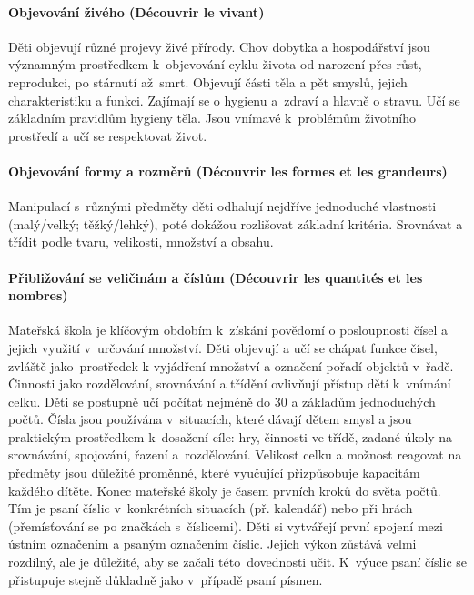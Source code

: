 			\paragraph{Objevování živého (Découvrir le vivant)} 
				Děti objevují různé projevy živé přírody. Chov dobytka a hospodářství jsou významným prostředkem k objevování cyklu života od narození přes růst, reprodukci, po stárnutí až smrt.
				Objevují části těla a pět smyslů, jejich charakteristiku a funkci. Zajímají se o hygienu a zdraví a hlavně o stravu. Učí se základním pravidlům hygieny těla. 
				Jsou vnímavé k problémům životního prostředí a učí se respektovat život. 
			\paragraph{Objevování formy a rozměrů (Découvrir les formes et les grandeurs)}
				Manipulací s různými předměty děti odhalují nejdříve jednoduché vlastnosti (malý/velký; těžký/lehký), poté dokážou rozlišovat základní kritéria. Srovnávat a třídit podle tvaru, velikosti, množství a obsahu.
			\paragraph{Přibližování se veličinám a číslům (Découvrir les quantités et les nombres)}
				Mateřská škola je klíčovým obdobím k získání povědomí o posloupnosti čísel a jejich využití v určování množství. Děti objevují a učí se chápat funkce čísel, zvláště jako prostředek k vyjádření množství a označení pořadí objektů v řadě.
				Činnosti jako rozdělování, srovnávání a třídění ovlivňují přístup dětí k vnímání celku. Děti se postupně učí počítat nejméně do 30 a základům jednoduchých počtů.
				Čísla jsou používána v situacích, které dávají dětem smysl a jsou praktickým prostředkem k dosažení cíle: hry, činnosti ve třídě, zadané úkoly na srovnávání, spojování, řazení a rozdělování. Velikost celku a možnost reagovat na předměty jsou důležité proměnné, které vyučující přizpůsobuje kapacitám každého dítěte. 
				Konec mateřské školy je časem prvních kroků do světa počtů. 
				Tím je psaní číslic v konkrétních situacích (př. kalendář) nebo při hrách (přemísťování se po značkách s číslicemi). Děti si vytvářejí první spojení mezi ústním označením a psaným označením číslic. Jejich výkon zůstává velmi rozdílný, ale je důležité, aby se začali této dovednosti učit. K výuce psaní číslic se přistupuje stejně důkladně jako v případě psaní písmen.
